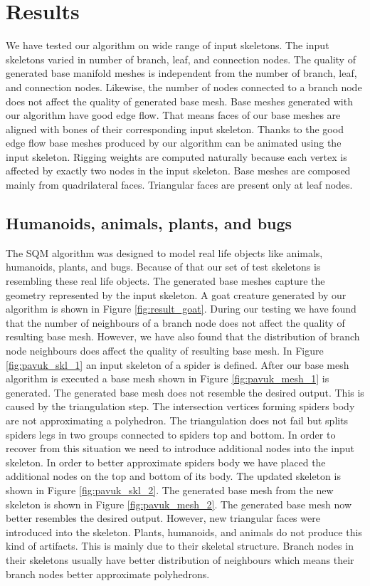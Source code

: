 \chapter{Results}

We have tested our algorithm on wide range of input skeletons.
The input skeletons varied in number of branch, leaf, and connection nodes.
The quality of generated base manifold meshes is independent from the number of branch, leaf, and connection nodes.
Likewise, the number of nodes connected to a branch node does not affect the quality of generated base mesh.
Base meshes generated with our algorithm have good edge flow.
That means faces of our base meshes are aligned with bones of their corresponding input skeleton.
Thanks to the good edge flow base meshes produced by our algorithm can be animated using the input skeleton.
Rigging weights are computed naturally because each vertex is affected by exactly two nodes in the input skeleton.
Base meshes are composed mainly from quadrilateral faces.
Triangular faces are present only at leaf nodes.

\section{Humanoids, animals, plants, and bugs}

The SQM algorithm was designed to model real life objects like animals, humanoids, plants, and bugs.
Because of that our set of test skeletons is resembling these real life objects.
The generated base meshes capture the geometry represented by the input skeleton.
A goat creature generated by our algorithm is shown in Figure \ref{fig:result_goat}.
During our testing we have found that the number of neighbours of a branch node does not affect the quality of resulting base mesh.
However, we have also found that the distribution of branch node neighbours does affect the quality of resulting base mesh.
In Figure \ref{fig:pavuk_skl_1} an input skeleton of a spider is defined.
After our base mesh algorithm is executed a base mesh shown in Figure \ref{fig:pavuk_mesh_1} is generated.
The generated base mesh does not resemble the desired output.
This is caused by the triangulation step.
The intersection vertices forming spiders body are not approximating a polyhedron.
The triangulation does not fail but splits spiders legs in two groups connected to spiders top and bottom.
In order to recover from this situation we need to introduce additional nodes into the input skeleton.
In order to better approximate spiders body we have placed the additional nodes on the top and bottom of its body.
The updated skeleton is shown in Figure \ref{fig:pavuk_skl_2}.
The generated base mesh from the new skeleton is shown in Figure \ref{fig:pavuk_mesh_2}.
The generated base mesh now better resembles the desired output.
However, new triangular faces were introduced into the skeleton.
Plants, humanoids, and animals do not produce this kind of artifacts.
This is mainly due to their skeletal structure.
Branch nodes in their skeletons usually have better distribution of neighbours which means their branch nodes better approximate polyhedrons.

